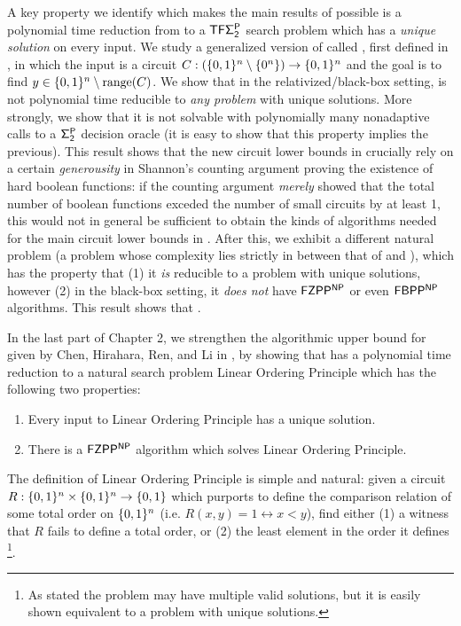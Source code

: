 A key property we identify which makes the main results of \cite{CHR, Li} possible is a polynomial time reduction from \avoid to a $\cl{TF\Sigma_2^P}$ search problem which has a \emph{unique solution} on every input.  We study a generalized version of \avoid called \strongavoid, first defined in \cite{KKMP}, in which the input is a circuit $C: (\{0,1\}^n \setminus \{0^n\}) \to \{0,1\}^n$ and the goal is to find $y \in \{0,1\}^n \setminus \mathrm{range}(C)$. We show that in the relativized/black-box setting, \strongavoid is not polynomial time reducible to \emph{any problem} with unique solutions. More strongly, we show that it is not solvable with polynomially many nonadaptive calls to a $\cl{\Sigma_2^P}$ decision oracle (it is easy to show that this property implies the previous). This result shows that the new circuit lower bounds in \cite{CHR,Li} crucially rely on a certain \emph{generousity} in Shannon's counting argument proving the existence of hard boolean functions: if the counting argument \emph{merely} showed that the total number of boolean functions exceded the number of small circuits by at least 1, this would not in general be sufficient to obtain the kinds of algorithms needed for the main circuit lower bounds in \cite{CHR24, Li}. After this, we exhibit a different natural problem (a problem whose complexity lies strictly in between that of \avoid and \strongavoid), which has the property that (1) it \emph{is} reducible to a problem with unique solutions, however (2) in the black-box setting, it \emph{does not} have $\cl{FZPP^{NP}}$ or even $\cl{FBPP^{NP}}$ algorithms. This result shows that .

In the last part of Chapter 2, we strengthen the algorithmic upper bound for \avoid given by Chen, Hirahara, Ren, and Li in \cite{CHR24, Li}, by showing that \avoid has a polynomial time reduction to a natural search problem {\sc Linear Ordering Principle} which has the following two properties:
\begin{enumerate}
    \item Every input to {\sc Linear Ordering Principle} has a unique solution.
    \item There is a $\cl{FZPP^{NP}}$ algorithm which solves  {\sc Linear Ordering Principle}.
\end{enumerate}
The definition of  {\sc Linear Ordering Principle} is simple and natural: given a circuit $R: \{0,1\}^n \times \{0,1\}^n \to \{0,1\}$ which purports to define the comparison relation of some total order on $\{0,1\}^n$ (i.e. $R(x,y)=1 \leftrightarrow x < y$), find either (1) a witness that $R$ fails to define a total order, or (2) the least element in the order it defines \footnote{As stated the problem may have multiple valid solutions, but it is easily shown equivalent to a problem with unique solutions.}. 

